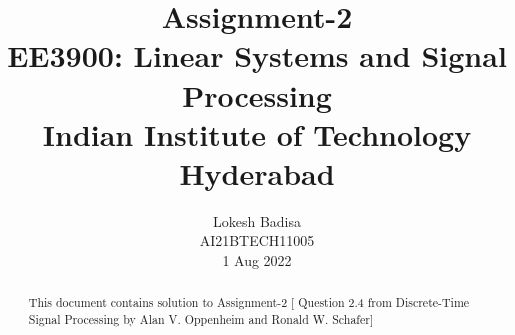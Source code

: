 \documentclass[journal,12pt,twocolumn]{IEEEtran}
\numberwithin{equation}{section}
\begin{document}
                             
\title{ Assignment-2 \\ \Large EE3900: Linear Systems and Signal Processing \\ \large Indian Institute of Technology Hyderabad}
\author{Lokesh Badisa \\ \normalsize AI21BTECH11005 \\ \vspace*{20pt} \normalsize 1 Aug 2022}   
\maketitle 
 
\begin{abstract}
 This document contains solution to Assignment-2 [ Question 2.4 from Discrete-Time Signal Processing by Alan V. Oppenheim and Ronald W. Schafer]
 \end{abstract}
\end{document}
